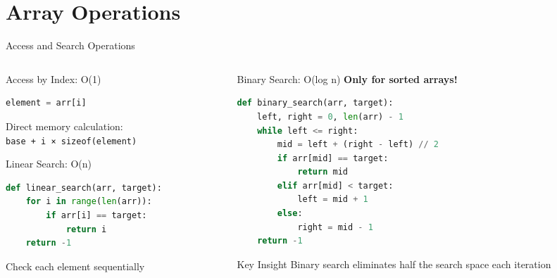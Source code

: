 \documentclass[aspectratio=169,xcolor=dvipsnames]{beamer}
\begin{document}
\section{Array Operations}

\begin{frame}[fragile]{Access and Search Operations}
  \begin{columns}
    \begin{column}{0.48\textwidth}
      \begin{block}{Access by Index: O(1)}
        \begin{lstlisting}[language=Python,basicstyle=\small\ttfamily]
element = arr[i]
        \end{lstlisting}
        Direct memory calculation: \\
        \texttt{base + i × sizeof(element)}
      \end{block}

      \vspace{0.3cm}

      \begin{block}{Linear Search: O(n)}
        \begin{lstlisting}[language=Python,basicstyle=\tiny\ttfamily]
def linear_search(arr, target):
    for i in range(len(arr)):
        if arr[i] == target:
            return i
    return -1
        \end{lstlisting}
        Check each element sequentially
      \end{block}
    \end{column}
    \begin{column}{0.48\textwidth}
      \begin{block}{Binary Search: O(log n)}
        \textbf{Only for sorted arrays!}
        \begin{lstlisting}[language=Python,basicstyle=\tiny\ttfamily]
def binary_search(arr, target):
    left, right = 0, len(arr) - 1
    while left <= right:
        mid = left + (right - left) // 2
        if arr[mid] == target:
            return mid
        elif arr[mid] < target:
            left = mid + 1
        else:
            right = mid - 1
    return -1
        \end{lstlisting}
      \end{block}

      \vspace{0.2cm}

      \begin{alertblock}{Key Insight}
        Binary search eliminates half the search space each iteration
      \end{alertblock}
    \end{column}
  \end{columns}
\end{frame}
\end{document}
